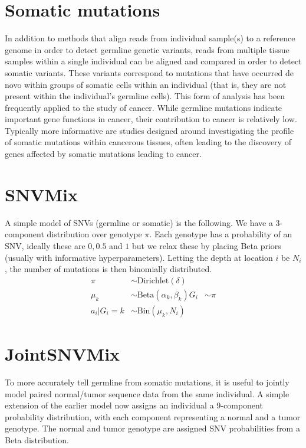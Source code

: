\documentclass[10pt]{article}
\begin{document}
\section{Somatic mutations}
In addition to methods that align reads from individual sample(s) to a reference genome in order to detect germline genetic variants, 
reads from multiple tissue samples within a single individual can be aligned and compared in order to detect somatic variants. 
These variants correspond to mutations that have occurred de novo within groups of somatic cells within an individual (that is, 
they are not present within the individual's germline cells). This form of analysis has been frequently applied to the study of cancer. 
While germline mutations indicate important gene functions in cancer, their contribution to cancer is relatively low. Typically more
informative are studies designed around investigating the profile of somatic mutations within cancerous tissues, often leading to the
discovery of genes affected by somatic mutations leading to cancer.

\section{SNVMix}
A simple model of SNVs (germline or somatic) is the following. We have a 3-component distribution over genotype $\pi$. Each genotype
has a probability of an SNV, ideally these are $0,0.5$ and $1$ but we relax these by placing Beta priors (usually with informative hyperparameters).
Letting the depth at location $i$ be $N_i$, the number of mutations is then binomially distributed.
\begin{align}
  \pi &\sim \text{Dirichlet}(\delta) \\
  \mu_k & \sim \text{Beta}(\alpha_k,\beta_k)
  G_i &\sim \pi \\
  a_i|G_i = k &\sim \text{Bin}(\mu_k,N_i)  
\end{align}

\section{JointSNVMix}
To more accurately tell germline from somatic mutations, it is useful to jointly model paired normal/tumor sequence data from the same
individual. A simple extension of the earlier model now assigns an individual a 9-component probability distribution, with each component
representing a normal and a tumor genotype. The normal and tumor genotype are assigned SNV probabilities from a Beta distribution.
\end{document}
